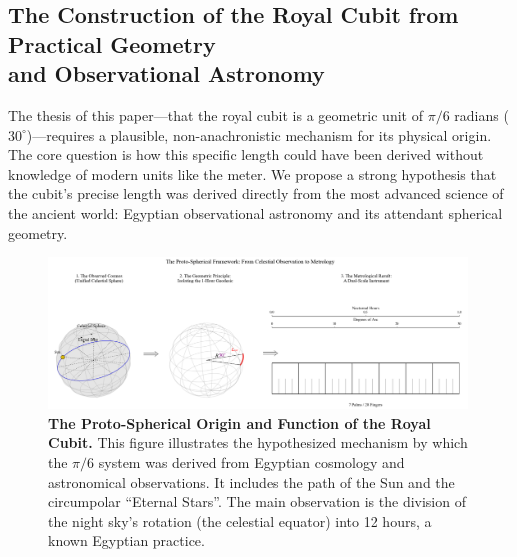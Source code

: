 \documentclass[11pt]{article}
\begin{document}

\subsection{The Construction of the Royal Cubit from Practical Geometry\\and Observational Astronomy}

The thesis of this paper—that the royal cubit is a geometric unit of $\pi/6$ radians ($30^\circ$)—requires a plausible, non-anachronistic mechanism for its physical origin. The core question is how this specific length could have been derived without knowledge of modern units like the meter. We propose a strong hypothesis that the cubit's precise length was derived directly from the most advanced science of the ancient world: Egyptian observational astronomy and its attendant spherical geometry.

\begin{figure}[h!]
\centering
\includegraphics[width=0.99\textwidth]{figures/celestial-fig.png}
\caption{\textbf{The Proto-Spherical Origin and Function of the Royal Cubit.} This figure illustrates the hypothesized mechanism by which the $\pi/6$ system was derived from Egyptian cosmology and astronomical observations. It includes the path of the Sun and the circumpolar ``Eternal Stars''. The main observation is the division of the night sky's rotation (the celestial equator) into 12 hours, a known Egyptian practice.}
\label{fig:celestial_origin}
\end{figure}
\end{document}
